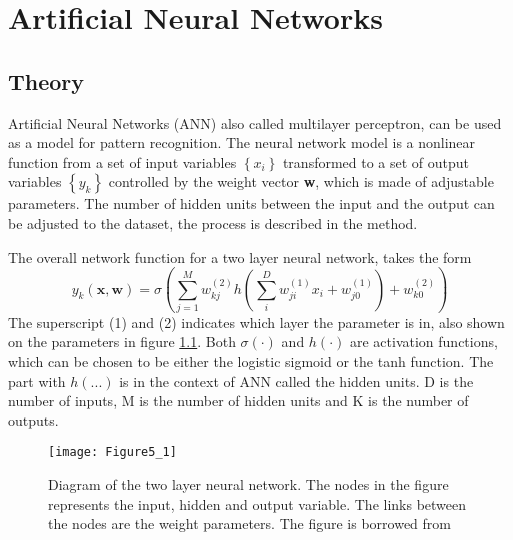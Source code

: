 \chapter{Artificial Neural Networks}

\section{Theory}
Artificial Neural Networks (ANN) also called multilayer perceptron, can be used as a model for pattern recognition. 
The neural network model is a nonlinear function from a set of input variables $ \left\lbrace x_i \right\rbrace  $ transformed to a set of output variables $ \left\lbrace y_k \right\rbrace  $ controlled by the weight vector \textbf{w}, which is made of adjustable parameters.
The number of hidden units between the input and the output can be adjusted to the dataset, the process is described in the method.

The overall network function for a two layer neural network, takes the form
\begin{equation}
y_k(\mathbf{x},\mathbf{w}) = \sigma \left( \sum_{j=1}^{M} w_{kj}^{(2)} h\left( \sum_{i}^{D} w_{ji}^{(1)} x_i + w_{j0}^{(1)} \right) + w_{k0}^{(2)} \right) 
\label{eq:ANN_overall}
\end{equation}
The superscript (1) and (2) indicates which layer the parameter is in, also shown on the parameters in figure \ref{fig:ANN_fig_theory}. 
Both $ \sigma(\cdot) $ and $ h(\cdot) $ are activation functions, which can be chosen to be either the logistic sigmoid or the tanh function.
The part with $ h(...) $ is in the context of ANN called the hidden units. 
D is the number of inputs, M is the number of hidden units and K is the number of outputs.


  
\begin{figure}[H]
\centering
\texttt{[image: Figure5\_1]}
\caption{Diagram of the two layer neural network. The nodes in the figure represents the input, hidden and output variable. The links between the nodes are the weight parameters. The figure is borrowed from \cite{bishop2007}} 
\label{fig:ANN_fig_theory}
\end{figure}

